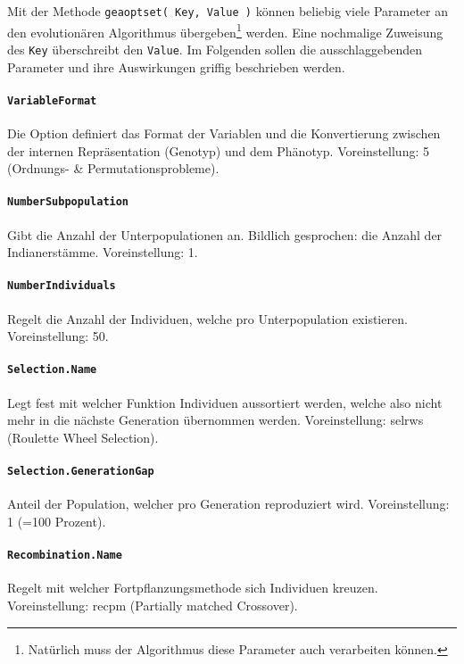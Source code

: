 Mit der Methode {\tt geaoptset( Key, Value )} können beliebig viele
Parameter an den evolutionären Algorithmus übergeben\footnote{Natürlich
muss der Algorithmus diese Parameter auch verarbeiten können.} werden.
Eine nochmalige Zuweisung des {\tt Key} überschreibt den {\tt Value}.
Im Folgenden sollen die ausschlaggebenden Parameter und
ihre Auswirkungen griffig beschrieben werden.


\paragraph{{\tt VariableFormat}} Die Option definiert das Format der Variablen
und die Konvertierung zwischen der internen Repräsentation (Genotyp) und dem
Phänotyp.
Voreinstellung: 5 (Ordnungs- \& Permutationsprobleme).

\paragraph{{\tt NumberSubpopulation}} Gibt die Anzahl der Unterpopulationen an.
Bildlich gesprochen: die Anzahl der Indianerstämme.
Voreinstellung: 1.

\paragraph{{\tt NumberIndividuals}} Regelt die Anzahl
der Individuen, welche pro Unterpopulation existieren.
Voreinstellung: 50.

\paragraph{{\tt Selection.Name}} Legt fest mit welcher Funktion Individuen
aussortiert werden, welche also nicht mehr in die nächste Generation
übernommen werden.
Voreinstellung: selrws (Roulette Wheel Selection).

\paragraph{{\tt Selection.GenerationGap}} Anteil der Population, welcher pro
Generation reproduziert wird.
Voreinstellung: 1 (=100 Prozent).

\paragraph{{\tt Recombination.Name}} Regelt mit welcher Fortpflanzungsmethode
sich Individuen kreuzen.
Voreinstellung: recpm (Partially matched Crossover).

